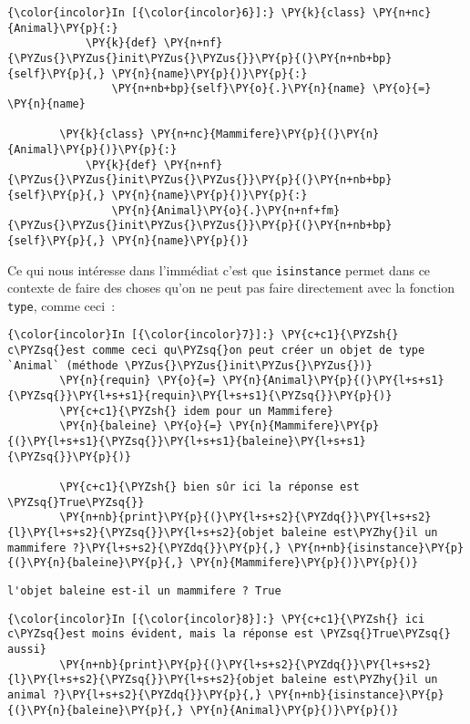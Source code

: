     \begin{Verbatim}[commandchars=\\\{\}]
{\color{incolor}In [{\color{incolor}6}]:} \PY{k}{class} \PY{n+nc}{Animal}\PY{p}{:}
            \PY{k}{def} \PY{n+nf}{\PYZus{}\PYZus{}init\PYZus{}\PYZus{}}\PY{p}{(}\PY{n+nb+bp}{self}\PY{p}{,} \PY{n}{name}\PY{p}{)}\PY{p}{:}
                \PY{n+nb+bp}{self}\PY{o}{.}\PY{n}{name} \PY{o}{=} \PY{n}{name}
        
        \PY{k}{class} \PY{n+nc}{Mammifere}\PY{p}{(}\PY{n}{Animal}\PY{p}{)}\PY{p}{:}
            \PY{k}{def} \PY{n+nf}{\PYZus{}\PYZus{}init\PYZus{}\PYZus{}}\PY{p}{(}\PY{n+nb+bp}{self}\PY{p}{,} \PY{n}{name}\PY{p}{)}\PY{p}{:}
                \PY{n}{Animal}\PY{o}{.}\PY{n+nf+fm}{\PYZus{}\PYZus{}init\PYZus{}\PYZus{}}\PY{p}{(}\PY{n+nb+bp}{self}\PY{p}{,} \PY{n}{name}\PY{p}{)}
\end{Verbatim}


    Ce qui nous intéresse dans l'immédiat c'est que \texttt{isinstance}
permet dans ce contexte de faire des choses qu'on ne peut pas faire
directement avec la fonction \texttt{type}, comme ceci~:

    \begin{Verbatim}[commandchars=\\\{\}]
{\color{incolor}In [{\color{incolor}7}]:} \PY{c+c1}{\PYZsh{} c\PYZsq{}est comme ceci qu\PYZsq{}on peut créer un objet de type `Animal` (méthode \PYZus{}\PYZus{}init\PYZus{}\PYZus{})}
        \PY{n}{requin} \PY{o}{=} \PY{n}{Animal}\PY{p}{(}\PY{l+s+s1}{\PYZsq{}}\PY{l+s+s1}{requin}\PY{l+s+s1}{\PYZsq{}}\PY{p}{)}
        \PY{c+c1}{\PYZsh{} idem pour un Mammifere}
        \PY{n}{baleine} \PY{o}{=} \PY{n}{Mammifere}\PY{p}{(}\PY{l+s+s1}{\PYZsq{}}\PY{l+s+s1}{baleine}\PY{l+s+s1}{\PYZsq{}}\PY{p}{)}
        
        \PY{c+c1}{\PYZsh{} bien sûr ici la réponse est \PYZsq{}True\PYZsq{}}
        \PY{n+nb}{print}\PY{p}{(}\PY{l+s+s2}{\PYZdq{}}\PY{l+s+s2}{l}\PY{l+s+s2}{\PYZsq{}}\PY{l+s+s2}{objet baleine est\PYZhy{}il un mammifere ?}\PY{l+s+s2}{\PYZdq{}}\PY{p}{,} \PY{n+nb}{isinstance}\PY{p}{(}\PY{n}{baleine}\PY{p}{,} \PY{n}{Mammifere}\PY{p}{)}\PY{p}{)}
\end{Verbatim}


    \begin{Verbatim}[commandchars=\\\{\}]
l'objet baleine est-il un mammifere ? True

    \end{Verbatim}

    \begin{Verbatim}[commandchars=\\\{\}]
{\color{incolor}In [{\color{incolor}8}]:} \PY{c+c1}{\PYZsh{} ici c\PYZsq{}est moins évident, mais la réponse est \PYZsq{}True\PYZsq{} aussi}
        \PY{n+nb}{print}\PY{p}{(}\PY{l+s+s2}{\PYZdq{}}\PY{l+s+s2}{l}\PY{l+s+s2}{\PYZsq{}}\PY{l+s+s2}{objet baleine est\PYZhy{}il un animal ?}\PY{l+s+s2}{\PYZdq{}}\PY{p}{,} \PY{n+nb}{isinstance}\PY{p}{(}\PY{n}{baleine}\PY{p}{,} \PY{n}{Animal}\PY{p}{)}\PY{p}{)}
\end{Verbatim}


